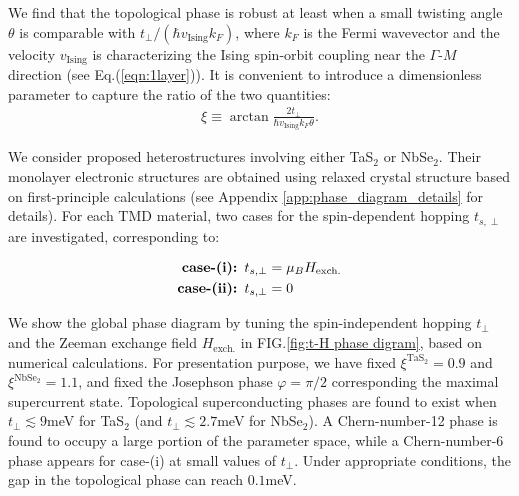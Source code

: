 We find that the topological phase is robust at least when a small twisting angle $\theta$ is comparable with $t_\perp/(\hbar v_{\text{Ising}} k_F)$, where $k_F$ is the Fermi wavevector and the velocity $v_{\text{Ising}}$ is characterizing the Ising spin-orbit coupling near the $\Gamma$-$M$ direction (see Eq.(\ref{eqn:1layer})). It is convenient to introduce a dimensionless parameter to capture the ratio of the two quantities:
\begin{align}
    \xi\equiv \arctan \frac{2t_\perp}{\hbar v_{\text{Ising}} k_F\theta}.\label{eqn:xi}
\end{align}

We consider proposed heterostructures involving either TaS$_2$ or NbSe$_2$. Their monolayer electronic structures are obtained using relaxed crystal structure based on first-principle calculations (see Appendix \ref{app:phase_diagram_details} for details). For each TMD material, two cases for the spin-dependent hopping $t_{s,\perp}$ are investigated, corresponding to:

\begin{align}
    \textbf{case-(i): }&t_{s,\perp}=\mu_BH_{\text{exch.}}\notag\\
    \textbf{case-(ii): }&t_{s,\perp}=0\label{eqn:cases}
\end{align}


We show the global phase diagram by tuning the spin-independent hopping $t_\perp$ and the Zeeman exchange field $H_{\text{exch.}}$ in FIG.\ref{fig:t-H phase digram}, based on numerical calculations. For presentation purpose, we have fixed $\xi^{\mathrm{TaS_2}}=0.9$ and $\xi^{\mathrm{NbSe_2}}=1.1$, and fixed the Josephson phase $\varphi=\pi/2$ corresponding the maximal supercurrent state. Topological superconducting phases are found to exist when $t_\perp\lesssim 9$meV for TaS$_2$ (and $t_\perp\lesssim 2.7$meV for NbSe$_2$). A Chern-number-12 phase is found to occupy a large portion of the parameter space, while a Chern-number-6 phase appears for case-(i) at small values of $t_\perp$. Under appropriate conditions, the gap in the topological phase can reach $0.1$meV. 

